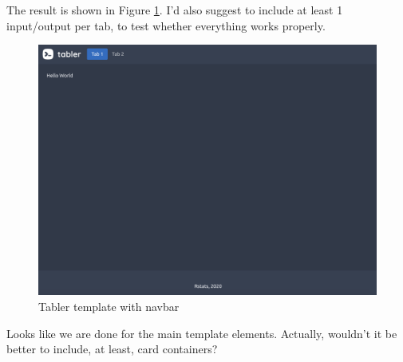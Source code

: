 \documentclass[]{book}
\newenvironment{Shaded}{\begin{snugshade}}{\end{snugshade}}
\newcommand{\ControlFlowTok}[1]{\textcolor[rgb]{0.13,0.29,0.53}{\textbf{#1}}}
\newcommand{\DataTypeTok}[1]{\textcolor[rgb]{0.13,0.29,0.53}{#1}}
\newcommand{\KeywordTok}[1]{\textcolor[rgb]{0.13,0.29,0.53}{\textbf{#1}}}
\newcommand{\NormalTok}[1]{#1}
\newcommand{\OperatorTok}[1]{\textcolor[rgb]{0.81,0.36,0.00}{\textbf{#1}}}
\newcommand{\StringTok}[1]{\textcolor[rgb]{0.31,0.60,0.02}{#1}}
\begin{document}
\begin{Shaded}
\end{Shaded}

The result is shown in Figure \ref{fig:tabler-nav}. I'd also suggest to include at least 1 input/output per tab, to test whether everything works properly.

\begin{figure}
\includegraphics[width=32.81in]{images/practice/tabler-nav} \caption{Tabler template with navbar}\label{fig:tabler-nav}
\end{figure}

Looks like we are done for the main template elements. Actually, wouldn't it be better to include, at least, card containers?
\end{document}
